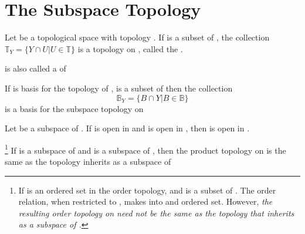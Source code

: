 \section{The Subspace Topology}

\begin{definition}\label{def:SubspaceTopology}
      Let  be a topological space with topology . If  is a subset of , the collection
      $ \mathbb{T}_{Y} = \{ Y \cap U | U \in \mathbb{T} \} $
      is a topology on , called the .

       is also called a  of 
\end{definition}

\begin{lemma}\omitObviuos
      If  is basis for the topology of ,  is a subset of  then the collection
      \begin{equation*}
            \mathbb{B}_{Y} = \{ B \cap Y | B \in \mathbb{B} \} 
      \end{equation*}
      is a basis for the subspace topology on 
\end{lemma}

\begin{lemma}\omitObviuos
      Let  be a subspace of . If  is open in  and  is open in , then  is open in .
\end{lemma}

\begin{theorem}\footnote{
      If  is an ordered set in the order topology, and  is a subset of . The order relation, when restricted to , makes  into and ordered set. However, \textit{
            the resulting order topology on  need not be the same as the topology that  inherits as a subspace of .
      }
}
      If  is a subspace of  and  is a subspace of , then the product topology on  is the same as the topology  inherits as a subspace of 
\end{theorem}

